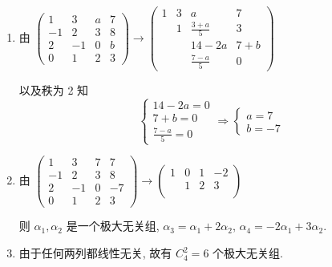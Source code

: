 	 \paragraph{} %
		 \begin{enumerate}
			 \item %
			       由 \( \begin{pmatrix} 1 & 3 & a & 7 \\ -1 & 2 & 3 & 8 \\ 2 & -1 & 0 & b \\ 0 & 1 & 2 & 3 \end{pmatrix} \to \begin{pmatrix} 1 & 3 & a & 7 \\ & 1 & \frac{3+a}{5} & 3 \\ & & 14-2a & 7+b \\ & & \frac{7-a}{5} &0 \end{pmatrix} \)

			       以及秩为 2 知
			       \[ \begin{cases} 14 - 2a = 0 \\ 7 + b = 0 \\ \frac{7 - a}{5} = 0 \end{cases} \Rightarrow \begin{cases} a = 7 \\ b = -7 \end{cases} \]
			 \item %
			       由 \( \begin{pmatrix} 1 & 3 & 7 & 7 \\ -1 & 2 & 3 & 8 \\ 2 & -1 & 0 & -7 \\ 0 & 1 & 2 & 3 \end{pmatrix} \to \begin{pmatrix} 1 &0 & 1 & -2 \\ & 1 & 2 & 3 \\ &  &  & \end{pmatrix} \)

			       则 \( \alpha_{1}, \alpha_{2} \) 是一个极大无关组, \( \alpha_{3} = \alpha_{1} + 2\alpha_{2} \), \( \alpha_{4} = -2\alpha_{1} + 3\alpha_{2} \).
			 \item %
			       由于任何两列都线性无关, 故有 \( C_{4}^{2} = 6 \) 个极大无关组.
		 \end{enumerate}


